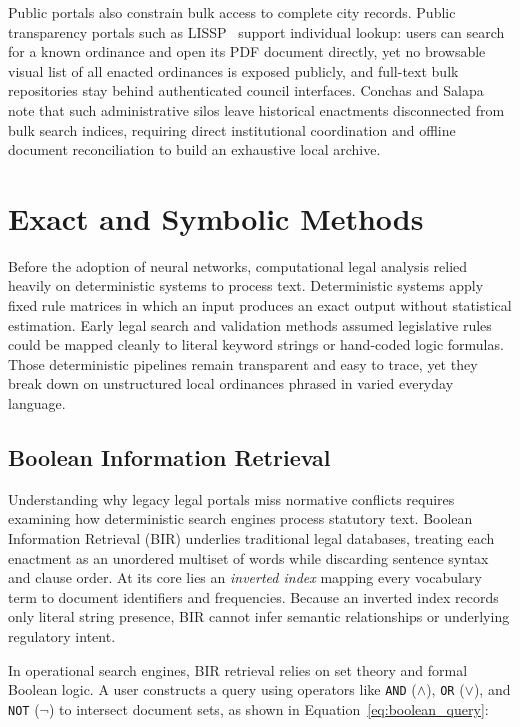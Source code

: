         Public portals also constrain bulk access to complete city records. Public transparency portals such as LISSP~\cite{citygov2025lissp, patumbon2025lissp} support individual lookup: users can search for a known ordinance and open its PDF document directly, yet no browsable visual list of all enacted ordinances is exposed publicly, and full-text bulk repositories stay behind authenticated council interfaces. Conchas and Salapa~\cite{conchas2025digital} note that such administrative silos leave historical enactments disconnected from bulk search indices, requiring direct institutional coordination and offline document reconciliation to build an exhaustive local archive.


\section{Exact and Symbolic Methods}
Before the adoption of neural networks, computational legal analysis relied heavily on deterministic systems to process text. Deterministic systems apply fixed rule matrices in which an input produces an exact output without statistical estimation. Early legal search and validation methods assumed legislative rules could be mapped cleanly to literal keyword strings or hand-coded logic formulas. Those deterministic pipelines remain transparent and easy to trace, yet they break down on unstructured local ordinances phrased in varied everyday language.

    \subsection{Boolean Information Retrieval}
    Understanding why legacy legal portals miss normative conflicts requires examining how deterministic search engines process statutory text. Boolean Information Retrieval (BIR) underlies traditional legal databases, treating each enactment as an unordered multiset of words while discarding sentence syntax and clause order. At its core lies an \textit{inverted index} mapping every vocabulary term to document identifiers and frequencies. Because an inverted index records only literal string presence, BIR cannot infer semantic relationships or underlying regulatory intent.
    
    In operational search engines, BIR retrieval relies on set theory and formal Boolean logic. A user constructs a query using operators like \texttt{AND} ($\land$), \texttt{OR} ($\lor$), and \texttt{NOT} ($\neg$) to intersect document sets, as shown in Equation~\eqref{eq:boolean_query}:

